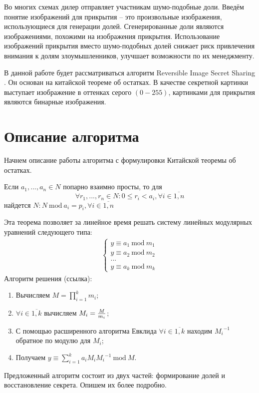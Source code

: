 \documentclass[a4paper,article,14pt]{extarticle}
\newcommand{\Mod}[1]{\ \mathrm{mod}\ #1}
\begin{document}
Во многих схемах дилер отправляет участникам шумо-подобные доли. Введём понятие изображений для прикрытия -- это произвольные 
изображения, использующиеся для генерации долей. Сгенерированные доли являются изображениями, похожими на изображения прикрытия. 
Использование изображений прикрытия вместо шумо-подобных долей снижает риск привлечения внимания к долям злоумышленников, улучшает возможности 
по их менеджменту. 

В данной работе будет рассматриваться алгоритм Reversible Image Secret Sharing \cite{RISS}. Он основан на китайской 
теореме об остатках. В качестве секретной картинки выступает изображение в оттенках серого $(0-255)$, картинками для прикрытия являются
бинарные изображения.


\newpage
\section{Описание алгоритма}
Начнем описание работы алгоритма с формулировки Китайской теоремы об остатках.

Если $ a_1,...,a_n \in N $ попарно взаимно просты, то для 
$$\forall r_1,...,r_n \in N : 0\leq r_i<a_i, \forall i\in \overline{1,n}$$
найдется $N: N \Mod a_i = p_i, \forall i\in \overline{1,n}$ 

Эта теорема позволяет за линейное время решать систему линейных модулярных уравнений следующего типа:
\begin{gather}
    \begin{cases}
    y \equiv a_1 \Mod m_1 \\
    y \equiv a_2 \Mod m_2 \\
    ... \\
    y \equiv a_k \Mod m_k
    \end{cases}
\end{gather}
Алгоритм решения (ссылка):
\begin{enumerate}
    \item Вычисляем $M=\prod\limits_{i = 1}^k m_i$;
    \item $\forall i\in \overline{1,k}$ вычисляем $M_i={{M} \over {m_i}}$;
    \item С помощью расширенного алгоритма Евклида $\forall i\in \overline{1,k}$ находим ${M_i}^{-1}$ обратное по модулю для $M_i$;
    \item Получаем $y \equiv \sum\limits_{i=1}^k a_i M_i {M_i}^{-1} \Mod M$.
\end{enumerate}

Предложенный алгоритм состоит из двух частей: формирование долей и восстановление секрета. Опишем их более подробно.
\end{document}
